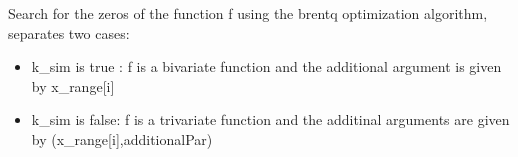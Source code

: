 \documentclass[letterpaper,10pt,english]{sphinxmanual}
\begin{document}

\begin{fulllineitems}
\label{Analisis/bounds:bounds.Get_bounds}
\end{fulllineitems}


\begin{fulllineitems}
\label{Analisis/bounds:bounds.Get_bounds2}
Search for the zeros of the function f  using the brentq optimization algorithm, separates two cases:
\begin{itemize}
\item {} 
k\_sim is true : f is a bivariate function and the additional argument is given by x\_range{[}i{]}

\item {} 
k\_sim is false: f is a trivariate function and the additinal arguments are given by (x\_range{[}i{]},additionalPar)

\end{itemize}

\end{fulllineitems}


\begin{fulllineitems}
\label{Analisis/bounds:bounds.Roots}
\end{fulllineitems}


\begin{fulllineitems}
\label{Analisis/bounds:bounds.plot_}
\end{fulllineitems}

\end{document}
